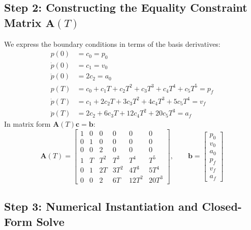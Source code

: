 \documentclass[11pt,a4paper]{article}
\begin{document}
\subsection{Step 2: Constructing the Equality Constraint Matrix \texorpdfstring{$\mathbf{A}(T)$}{A(T)}}

We express the boundary conditions in terms of the basis derivatives:
\begin{align}
p(0) &= c_0 = p_0 \\
\dot{p}(0) &= c_1 = v_0 \\
\ddot{p}(0) &= 2 c_2 = a_0 \\
p(T) &= c_0 + c_1 T + c_2 T^2 + c_3 T^3 + c_4 T^4 + c_5 T^5 = p_f \\
\dot{p}(T) &= c_1 + 2 c_2 T + 3 c_3 T^2 + 4 c_4 T^3 + 5 c_5 T^4 = v_f \\
\ddot{p}(T) &= 2 c_2 + 6 c_3 T + 12 c_4 T^2 + 20 c_5 T^3 = a_f
\end{align}
In matrix form $\mathbf{A}(T) \mathbf{c} = \mathbf{b}$:
\begin{equation}
\label{eq:A_quintic_symbolic}
\mathbf{A}(T) = \begin{bmatrix}
1 & 0 & 0 & 0 & 0 & 0 \\
0 & 1 & 0 & 0 & 0 & 0 \\
0 & 0 & 2 & 0 & 0 & 0 \\
1 & T & T^2 & T^3 & T^4 & T^5 \\
0 & 1 & 2T & 3T^2 & 4T^3 & 5T^4 \\
0 & 0 & 2 & 6T & 12T^2 & 20T^3
\end{bmatrix}, \qquad
\mathbf{b} = \begin{bmatrix}
p_0 \\ v_0 \\ a_0 \\ p_f \\ v_f \\ a_f
\end{bmatrix}
\end{equation}

\subsection{Step 3: Numerical Instantiation and Closed-Form Solve}
\end{document}
